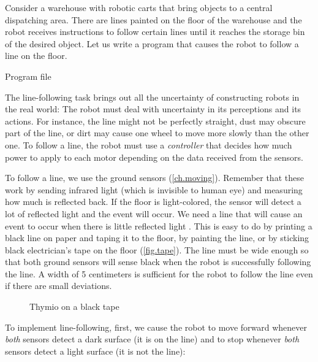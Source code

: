 
\label{ch.line}

Consider a warehouse with robotic carts that bring objects to a central
dispatching area. There are lines painted on the floor of the warehouse
and the robot receives instructions to follow certain lines until it
reaches the storage bin of the desired object. Let us write a program
that causes the robot to follow a line on the floor.

{\raggedleft \hfill Program file }

The line-following task brings out all the uncertainty of constructing
robots in the real world: The robot must deal with uncertainty in its
perceptions and its actions. For instance, the line might not be
perfectly straight, dust may obscure part of the line, or dirt may cause
one wheel to move more slowly than the other one. To follow a line, the
robot must use a \emph{controller} that decides how much power to apply
to each motor depending on the data received from the sensors.


To follow a line, we use the ground sensors (\cref{ch.moving}). Remember
that these work by sending infrared light (which is invisible to human
eye) and measuring how much is reflected back. If the floor is
light-colored, the sensor will detect a lot of reflected light and the
event  will occur. We need a line that will cause
an event to occur when there is little reflected light
. This is easy to do by printing a black line on
paper and taping it to the floor, by painting the line, or by sticking
black electrician's tape on the floor (\cref{fig.tape}). The line must
be wide enough so that both ground sensors will sense black when the
robot is successfully following the line. A width of 5 centimeters is
sufficient for the robot to follow the line even if there are small
deviations.

\begin{figure}
\hfill
{}
\caption{Thymio on a black tape}
\end{figure}

To implement line-following, first, we cause the robot to move forward
whenever \emph{both} sensors detect a dark surface (it is on the line)
and to stop whenever \emph{both} sensors detect a light surface (it is
not the line):

